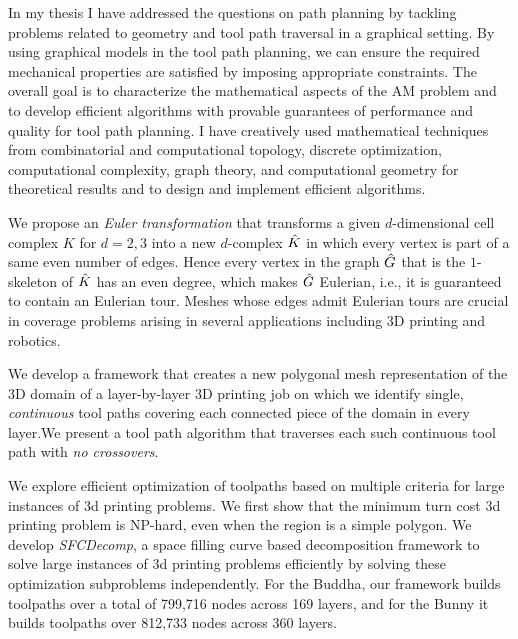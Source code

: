 In my thesis I have addressed the questions on path planning by tackling problems related to geometry and tool path traversal in a graphical setting. By using graphical models in the tool path planning, we can ensure the required mechanical properties are satisfied by imposing appropriate constraints. The overall goal is to characterize the mathematical aspects of the AM problem and to develop efficient algorithms with provable guarantees of performance and quality for tool path planning. I have creatively used mathematical techniques from combinatorial and computational topology, discrete optimization, computational complexity, graph theory, and computational geometry for theoretical results and to design and implement efficient algorithms.

We propose an \emph{Euler transformation} that transforms a given $d$-dimensional cell complex $K$ for $d=2,3$ into a new $d$-complex $\hat{K}$ in which every vertex is part of a same even number of edges. Hence every vertex in the graph $\hat{G}$ that is the $1$-skeleton of $\hat{K}$ has an even degree, which makes $\hat{G}$ Eulerian, i.e., it is guaranteed to contain an Eulerian tour. Meshes whose edges admit Eulerian tours are crucial in coverage problems arising in several applications including 3D printing and robotics.

We develop a framework that creates a new polygonal mesh representation of the 3D domain of a layer-by-layer 3D printing job on which we identify single, \emph{continuous} tool paths covering each connected piece of the domain in every layer.We present a tool path algorithm that traverses each such continuous tool path with \emph{no crossovers}.

We explore efficient optimization of toolpaths based on multiple criteria for large instances of 3d printing problems.
  We first show that the minimum turn cost 3d printing problem is NP-hard, even when the region is a simple polygon.  
  We develop \emph{SFCDecomp}, a space filling curve based decomposition framework to solve large instances of 3d printing problems efficiently by solving these optimization subproblems independently.
  For the Buddha, our framework builds toolpaths over a total of 799,716 nodes across 169 layers, and for the Bunny it builds toolpaths over 812,733 nodes across 360 layers.